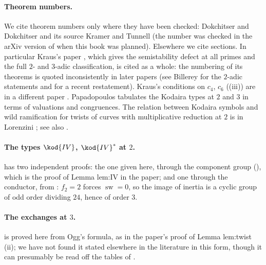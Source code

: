 \paragraph{Theorem numbers.} We cite theorem numbers only where they have been checked: Dokchitser and
Dokchitser \cite[Theorem 3.1]{DokDok15} and its source Kramer and Tunnell \cite[Proposition 8.20]{KramerTunnell82} (the number was checked in the arXiv
version of \cite{DokDok15} when this book was planned). Elsewhere we cite sections. In particular Kraus's paper \cite{Kraus90}, which gives the semistability defect at
all primes and the full $2$- and $3$-adic classification, is cited as a whole: the numbering of its theorems is quoted inconsistently in
later papers (see Billerey \cite{Billerey09} for the $2$-adic statements and \cite{PinedaMartin26} for a recent restatement). Kraus's
conditions on $c_4$, $c_6$ ((iii)) are in a different paper \cite{Kraus89}. Papadopoulos
\cite{Papadopoulos93} tabulates the Kodaira types at $2$ and $3$ in terms of valuations and congruences. The relation between Kodaira
symbols and wild ramification for twists of curves with multiplicative reduction at $2$ is in Lorenzini \cite{Lorenzini10}; see also
\cite{Praveen26}.

\paragraph{The types $\kod{IV}$, $\kod{IV}^*$ at $2$.}  has two independent proofs: the one given here,
through the component group (), which is the proof of Lemma lem:IV in the paper; and
one through the conductor, from : $f_2=2$ forces $\operatorname{sw}=0$, so the image of inertia is a
cyclic group of odd order dividing $24$, hence of order $3$.

\paragraph{The exchanges at $3$.}  is proved here from Ogg's formula, as in the paper's proof of Lemma
lem:twist (ii); we have not found it stated elsewhere in the literature in this form, though it can presumably be read off the tables of \cite{Papadopoulos93}.

